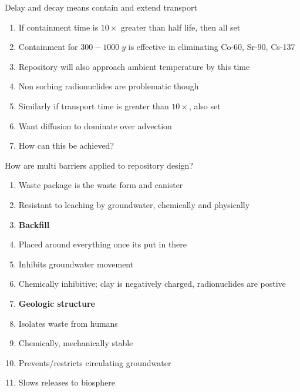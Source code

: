 \documentclass[aspectratio=1610,pdftex,dvipsnames,compress,xcolor={dvipsnames}]{beamer}
\begin{document}
\begin{frame}{Delay and decay means contain and extend transport}
    \begin{enumerate}[series=outerlist,topsep=0pt,itemsep=15pt,leftmargin=*,label=(\arabic*)]
        \item[]If containment time is $10 \times$ greater than half life, then all set
        \item[]Containment for $300 - 1000 \; y$ is effective in eliminating Co-60, Sr-90, Cs-137
        \item[]Repository will also approach ambient temperature by this time
        \item[]Non sorbing radionuclides are problematic though
        \item[]Similarly if transport time is greater than $10 \times$, also set
        \item[]Want diffusion to dominate over advection
        \item[]How can this be achieved?
    \end{enumerate}
\end{frame}


\begin{frame}{How are multi barriers applied to repository design?}
    \begin{enumerate}[series=outerlist,topsep=0pt,itemsep=1pt,leftmargin=*,label=(\arabic*)]
        \item[]Waste package is the waste form and canister
        \item[]Resistant to leaching by groundwater, chemically and physically
            \vspace{0.15in}
        \item[]\textbf{Backfill}
        \item[]Placed around everything once its put in there
        \item[]Inhibits groundwater movement
        \item[]Chemically inhibitive; clay is negatively charged, radionuclides are postive
            \vspace{0.15in}
        \item[]\textbf{Geologic structure}
        \item[]Isolates waste from humans 
        \item[]Chemically, mechanically stable
        \item[]Prevents/restricts circulating groundwater
        \item[]Slows releases to biosphere
    \end{enumerate}
\end{frame}
\end{document}
